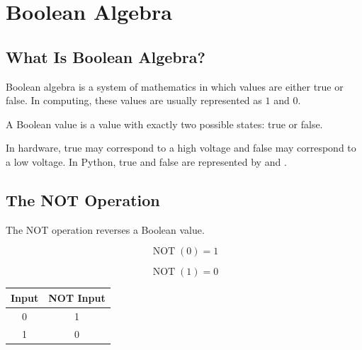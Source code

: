 \chapter{Boolean Algebra}
\label{chap:boolean-algebra}



\section{What Is Boolean Algebra?}

Boolean algebra is a system of mathematics in which values are either true or false. In computing, these values are usually represented as \(1\) and \(0\).

\begin{definition}
A Boolean value is a value with exactly two possible states: true or false.
\end{definition}

In hardware, true may correspond to a high voltage and false may correspond to a low voltage. In Python, true and false are represented by  and .

\section{The NOT Operation}

The NOT operation reverses a Boolean value.

\[
\operatorname{NOT}(0)=1
\]

\[
\operatorname{NOT}(1)=0
\]

\begin{center}
\begin{tabular}{cc}
\toprule
Input & NOT Input \\
\midrule
0 & 1 \\
1 & 0 \\
\bottomrule
\end{tabular}
\end{center}

